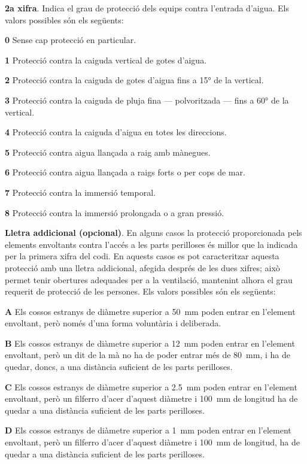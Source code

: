\textbf{2a xifra}. Indica el grau de protecció dels equips contra
l'entrada d'aigua. Els valors possibles són els següents:
\begin{list}{}
   {\setlength{\labelwidth}{10mm} \setlength{\leftmargin}{10mm} \setlength{\labelsep}{2mm}}
   \item[\textbf{0}] Sense cap protecció en particular.
   \item[\textbf{1}] Protecció contra la caiguda vertical de gotes d'aigua.
   \item[\textbf{2}] Protecció contra la caiguda de gotes d'aigua fins a \ang{15} de la  vertical.
   \item[\textbf{3}] Protecció contra la caiguda de pluja fina --- polvoritzada --- fins a \ang{60} de la  vertical.
   \item[\textbf{4}] Protecció contra la caiguda d'aigua en totes les direccions.
   \item[\textbf{5}] Protecció contra aigua llançada a raig amb mànegues.
   \item[\textbf{6}] Protecció contra aigua llançada a raigs forts o per cops de mar.
   \item[\textbf{7}] Protecció contra la immersió temporal.
   \item[\textbf{8}] Protecció contra la immersió prolongada o a gran pressió.
\end{list}


\textbf{Lletra addicional (opcional)}. En alguns casos la protecció
proporcionada pels elements envoltants contra l'accés a les parts
perilloses és millor que la indicada per la primera xifra del codi.
En aquests casos es pot caracteritzar aquesta protecció amb una
lletra addicional, afegida després de les dues xifres; això permet
tenir obertures adequades per a la ventilació,  mantenint alhora el
grau requerit de protecció de les persones. Els valors possibles són
els següents:
\begin{list}{}
   {\setlength{\labelwidth}{10mm} \setlength{\leftmargin}{10mm} \setlength{\labelsep}{2mm}}
   \item[\textbf{A}] Els  cossos estranys de diàmetre superior a
   \qty{50}{mm}    poden entrar en l'element envoltant, però només d'una forma voluntària i deliberada.
   \item[\textbf{B}] Els  cossos estranys de diàmetre superior a \qty{12}{mm}
    poden entrar en l'element envoltant, però un dit de la mà no ha de poder entrar més de \qty{80}{mm}, i
    ha de quedar, doncs, a una distància    suficient de les parts perilloses.
   \item[\textbf{C}] Els  cossos estranys de diàmetre superior a \qty{2,5}{mm}
   poden entrar en l'element envoltant, però un filferro d'acer d'aquest diàmetre i \qty{100}{mm}
   de longitud ha de quedar a una distància suficient de les parts perilloses.
   \item[\textbf{D}] Els  cossos estranys de diàmetre superior a \qty{1}{mm}
   poden entrar en l'element envoltant, però un filferro d'acer d'aquest diàmetre i \qty{100}{mm}
   de longitud, ha de quedar a una distància suficient de les parts perilloses.
\end{list}

